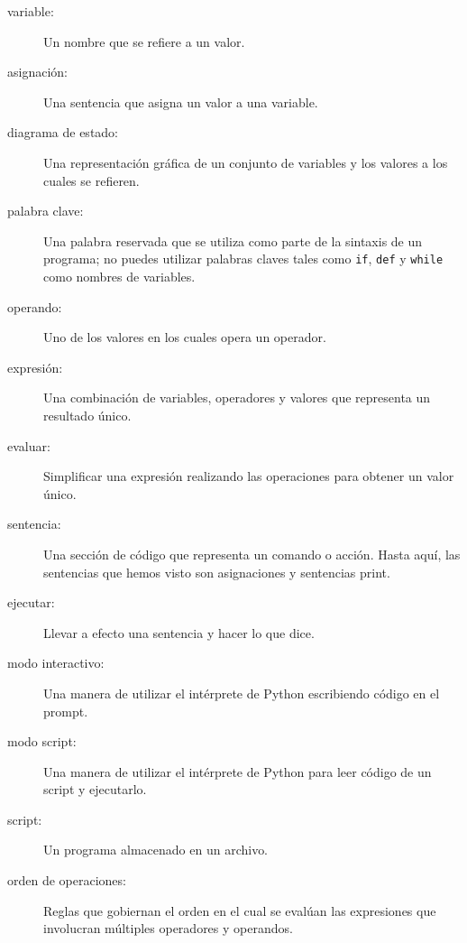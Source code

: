 \documentclass[10pt]{book}
\begin{document}
\begin{description}

\item[variable:]  Un nombre que se refiere a un valor.

\item[asignación:]  Una sentencia que asigna un valor a una variable.

\item[diagrama de estado:]  Una representación gráfica de un conjunto de variables y los
valores a los cuales se refieren.

\item[palabra clave:]  Una palabra reservada que se utiliza como parte de la sintaxis
de un programa; no puedes utilizar palabras claves tales como {\tt if}, {\tt  def} y {\tt while} como
nombres de variables.

\item[operando:]  Uno de los valores en los cuales opera un operador.

\item[expresión:]  Una combinación de variables, operadores y valores que
representa un resultado único.

\item[evaluar:]  Simplificar una expresión realizando las operaciones
para obtener un valor único.

\item[sentencia:]  Una sección de código que representa un comando o acción.  Hasta
aquí, las sentencias que hemos visto son asignaciones y sentencias print.

\item[ejecutar:]  Llevar a efecto una sentencia y hacer lo que dice.

\item[modo interactivo:] Una manera de utilizar el intérprete de Python
escribiendo código en el prompt.

\item[modo script:] Una manera de utilizar el intérprete de Python para leer
código de un script y ejecutarlo.

\item[script:] Un programa almacenado en un archivo.

\item[orden de operaciones:]  Reglas que gobiernan el orden en el cual
se evalúan las expresiones que involucran múltiples operadores y operandos.


\end{description}
\end{document}
